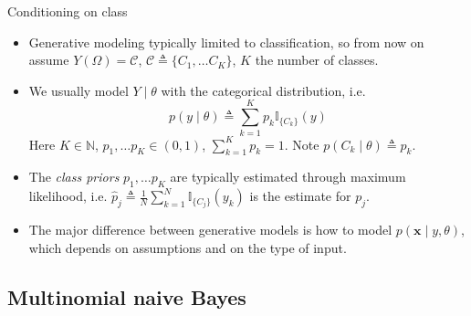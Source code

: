 \documentclass{beamer}
\numberwithin{equation}{section}
\begin{document}
\begin{frame}{Conditioning on class}
    \begin{itemize}
        \item
        Generative modeling typically limited to classification, so from now on
        assume $ Y(\Omega) = \mathcal{C} $, $ \mathcal{C} \triangleq \{C_1,
        \ldots C_K\} $, $ K $ the number of classes.

        \item
        We usually model $ Y \mid \theta $ with the categorical distribution,
        i.e.
        \begin{equation} \label{cat_dist_like}
            p(y \mid \theta) \triangleq
            \sum_{k = 1}^Kp_k\mathbb{I}_{\{C_k\}}(y)
        \end{equation}
        Here $ K \in \mathbb{N} $, $ p_1, \ldots p_K \in (0, 1) $,
        $ \sum_{k = 1}^Kp_k = 1 $. Note $ p(C_k \mid \theta) \triangleq p_k $.

        \item        
        The \textit{class priors} $ p_1, \ldots p_K $ are typically estimated
        through maximum likelihood, i.e. $ \hat{p}_j \triangleq \frac{1}{N}
        \sum_{k = 1}^N\mathbb{I}_{\{C_j\}}(y_k) $ is the estimate for $ p_j $.

        \item
        The major difference between generative models is how to model
        $ p(\mathbf{x} \mid y, \theta) $, which depends on assumptions and on
        the type of input.
    \end{itemize}
\end{frame}

\subsection{Multinomial naive Bayes}
\end{document}
